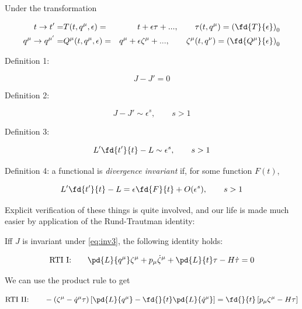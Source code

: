 \documentclass[12pt]{article}
\numberwithin{equation}{section}
\begin{document}
Under the transformation

\begin{eqnarray}
  t \to t' = & T(t,q^\mu,\epsilon) = & t + \epsilon\tau + ..., \qquad \tau(t,q^\mu)=\left(\fd{T}{\epsilon}\right)_0\\
  q^\mu \to q^{\mu{'}} = & Q^\mu(t,q^\mu,\epsilon) = & q^\mu + \epsilon\zeta^\mu + ...,  \qquad \zeta^\mu(t,q^\nu)=\left(\fd{Q^\mu}{\epsilon}\right)_0\notag
\end{eqnarray}

Definition 1: 

\begin{equation}
  \label{eq:inv1}
  J-J'=0
\end{equation}

Definition 2: 

\begin{equation}
  \label{eq:inv2}
  J-J' \sim \epsilon^{s}, \qquad s>1
\end{equation}

Definition 3:

\begin{equation}
  \label{eq:inv3}
  L'\fd{t'}{t} - L \sim \epsilon^s , \qquad s>1
\end{equation}

Definition 4: a functional is {\it divergence invariant} if, for some
function $F(t)$,

\begin{equation}
  \label{eq:inv4}
  L'\fd{t'}{t} - L  = \epsilon \fd{F}{t} + O(\epsilon^s) , \qquad s>1
\end{equation}

Explicit verification of these things is quite involved, and our life
is made much easier by application of the Rund-Trautman identity:

Iff $J$ is invariant under \ref{eq:inv3}, the following identity holds:

\begin{equation}
  \label{eq:rti1}
  \textrm{RTI I:}\qquad\pd{L}{q^\mu}\zeta^\mu + p_\mu\dot{\zeta}^\mu + \pd{L}{t}\tau - H\dot{\tau} = 0
\end{equation}

We can use the product rule to get 

\begin{equation}
  \label{eq:rti2}
  \textrm{RTI II:}\qquad-\left( \zeta^\mu - \dot{q}^\mu\tau \right)\left[ \pd{L}{q^\mu} - \fd{}{t}\pd{L}{\dot{q}^\mu}  \right]
    = \fd{}{t}\left[ p_\mu\zeta^\mu - H\tau  \right]
\end{equation}
\end{document}

